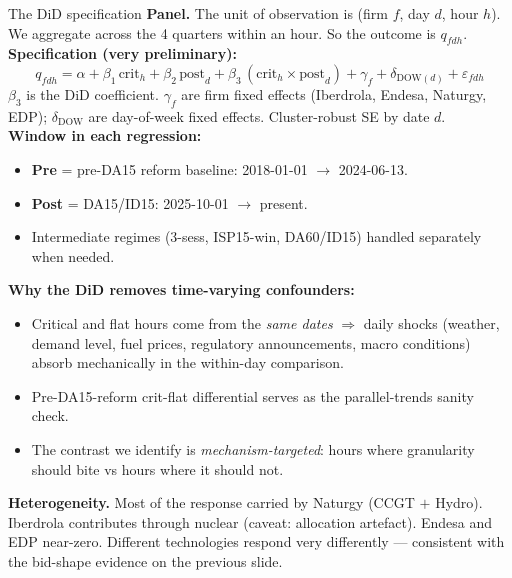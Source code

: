 \documentclass[10pt,aspectratio=169]{beamer}
\begin{document}
\begin{frame}{The DiD specification}
  \footnotesize
  \textbf{Panel.} The unit of observation is (firm $f$, day $d$, hour $h$). We aggregate across the 4 quarters within an hour. So the outcome is $q_{fdh}$.\\[4pt]
  \textbf{Specification (very preliminary):}
  \[ q_{fdh} = \alpha + \beta_1 \,\text{crit}_h + \beta_2 \,\text{post}_d + \beta_3 \,(\text{crit}_h \times \text{post}_d) + \gamma_f + \delta_{\text{DOW}(d)} + \varepsilon_{fdh} \]
  $\beta_3$ is the DiD coefficient. $\gamma_f$ are firm fixed effects (Iberdrola, Endesa, Naturgy, EDP); $\delta_{\text{DOW}}$ are day-of-week fixed effects. Cluster-robust SE by date $d$.\\[4pt]
  \textbf{Window in each regression:}
  \begin{itemize}
    \item \textbf{Pre} = pre-DA15 reform baseline: 2018-01-01 $\to$ 2024-06-13.
    \item \textbf{Post} = DA15/ID15: 2025-10-01 $\to$ present.
    \item Intermediate regimes (3-sess, ISP15-win, DA60/ID15) handled separately when needed.
  \end{itemize}
  \textbf{Why the DiD removes time-varying confounders:}
  \begin{itemize}
    \item Critical and flat hours come from the \emph{same dates} $\Rightarrow$ daily shocks (weather, demand level, fuel prices, regulatory announcements, macro conditions) absorb mechanically in the within-day comparison.
    \item Pre-DA15-reform crit-flat differential serves as the parallel-trends sanity check.
    \item The contrast we identify is \emph{mechanism-targeted}: hours where granularity should bite vs hours where it should not.
  \end{itemize}
  \textbf{Heterogeneity.} Most of the response carried by Naturgy (CCGT $+$ Hydro). Iberdrola contributes through nuclear (caveat: allocation artefact). Endesa and EDP near-zero. Different technologies respond very differently --- consistent with the bid-shape evidence on the previous slide.
\end{frame}
\end{document}

